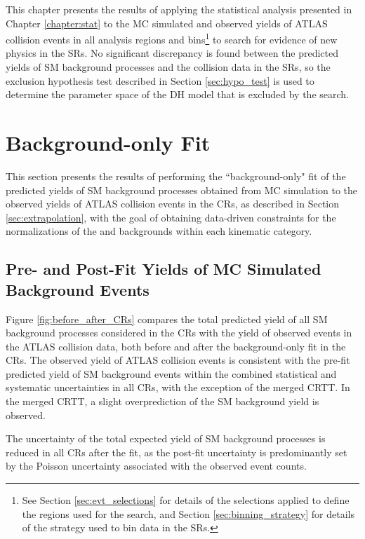 \label{chapter:results}

This chapter presents the results of applying the statistical analysis presented in Chapter \ref{chapter:stat} to the MC simulated and observed yields of ATLAS collision events in all analysis regions and bins\footnote{See Section \ref{sec:evt_selections} for details of the selections applied to define the regions used for the search, and Section \ref{sec:binning_strategy} for details of the strategy used to bin data in the SRs.} to search for evidence of new physics in the SRs. No significant discrepancy is found between the predicted yields of SM background processes and the collision data in the SRs, so the exclusion hypothesis test described in Section \ref{sec:hypo_test} is used to determine the parameter space of the DH model that is excluded by the search.


\section{Background-only Fit}

This section presents the results of performing the ``background-only" fit of the predicted yields of SM background processes obtained from MC simulation to the observed yields of ATLAS collision events in the CRs, as described in Section \ref{sec:extrapolation}, with the goal of obtaining data-driven constraints for the normalizations of the \wjets and \ttbar backgrounds within each kinematic category.

\subsection{Pre- and Post-Fit Yields of MC Simulated Background Events}

Figure \ref{fig:before_after_CRs} compares the total predicted yield of all SM background processes considered in the CRs with the yield of observed events in the ATLAS collision data, both before and after the background-only fit in the CRs. The observed yield of ATLAS collision events is consistent with the pre-fit predicted yield of SM background events within the combined statistical and systematic uncertainties in all CRs, with the exception of the merged CRTT. In the merged CRTT, a slight overprediction of the SM background yield is observed. 

The uncertainty of the total expected yield of SM background processes is reduced in all CRs after the fit, as the post-fit uncertainty is predominantly set by the Poisson uncertainty associated with the observed event counts.

